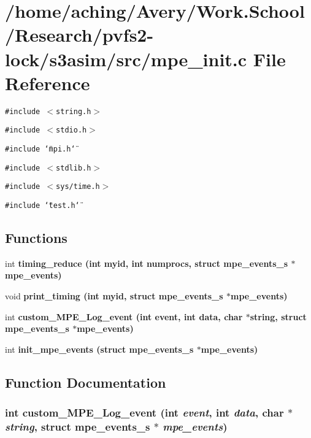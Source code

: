 \section{/home/aching/Avery/Work.School/Research/pvfs2-lock/s3asim/src/mpe\_\-init.c File Reference}
\label{mpe__init_8c}
{\tt \#include $<$string.h$>$}\par
{\tt \#include $<$stdio.h$>$}\par
{\tt \#include \char`\"{}mpi.h\char`\"{}}\par
{\tt \#include $<$stdlib.h$>$}\par
{\tt \#include $<$sys/time.h$>$}\par
{\tt \#include \char`\"{}test.h\char`\"{}}\par
\subsection*{Functions}
\begin{CompactItemize}
\item 
int \bf{timing\_\-reduce} (int myid, int numprocs, struct \bf{mpe\_\-events\_\-s} $\ast$mpe\_\-events)
\item 
void \bf{print\_\-timing} (int myid, struct \bf{mpe\_\-events\_\-s} $\ast$mpe\_\-events)
\item 
int \bf{custom\_\-MPE\_\-Log\_\-event} (int event, int data, char $\ast$string, struct \bf{mpe\_\-events\_\-s} $\ast$mpe\_\-events)
\item 
int \bf{init\_\-mpe\_\-events} (struct \bf{mpe\_\-events\_\-s} $\ast$mpe\_\-events)
\end{CompactItemize}


\subsection{Function Documentation}
\subsubsection{\setlength{\rightskip}{0pt plus 5cm}int custom\_\-MPE\_\-Log\_\-event (int {\em event}, int {\em data}, char $\ast$ {\em string}, struct \bf{mpe\_\-events\_\-s} $\ast$ {\em mpe\_\-events})}\label{mpe__init_8c_ca0bad04081205f395d4fbb25624bb0f}


